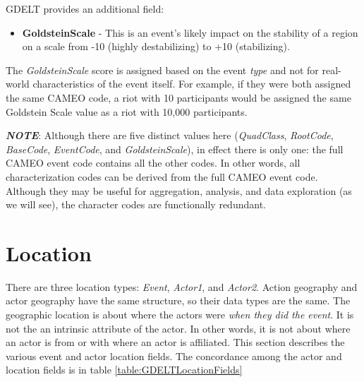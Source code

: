 \par GDELT provides an additional field:

\begin{itemize}
\item \textbf{GoldsteinScale} - This is an event's likely impact on the stability of a region on a scale from -10 (highly destabilizing) to +10 (stabilizing). 
\end{itemize}

\par The \textit{GoldsteinScale} score is assigned based on the event \textit{type} and not for real-world characteristics of the event itself. For example, if they were both assigned the same CAMEO code, a riot with 10 participants would be assigned the same Goldstein Scale value as a riot with 10,000 participants. 


\par \textbf{\textit{NOTE}}: Although there are five distinct values here (\textit{QuadClass}, \textit{RootCode}, \textit{BaseCode}, \textit{EventCode}, and \textit{GoldsteinScale}), in effect there is only one: the full CAMEO event code contains all the other codes. In other words, all characterization codes can be derived from the full CAMEO event code. Although they may be useful for aggregation, analysis, and data exploration (as we will see), the character codes are functionally redundant.
              
\section{Location}
There are three location types: \emph{Event}, \emph{Actor1}, and \emph{Actor2}.
Action geography and actor geography have the same structure, so their data types are the same. The geographic location is about where the actors were \emph{when they did the event}. It is not the an intrinsic attribute of the actor. In other words, it is not about where an actor is from or with where an actor is affiliated. 
This section describes the various event and actor location fields. The concordance among the actor and location fields is in table \ref{table:GDELTLocationFields}

